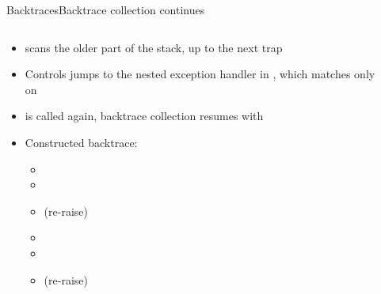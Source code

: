 \begin{frame}{Backtraces}{Backtrace collection continues}
  \begin{columns}[c]
    \begin{column}{0.55\textwidth}
      \minipage[c][0.75\textheight][s]{\columnwidth}
      \begin{itemize}
        \item<1->  scans the older part of the stack, up to the next trap
        \item<6-> Controls jumps to the nested exception handler in , which matches only on 
        \item<7->  is called again, backtrace collection resumes with 
      \end{itemize}
      \medskip
      \begin{itemize}
        \item<2-> Constructed backtrace:
        \begin{itemize}
          \item <2-> 
          \item <2-> 
          \item <3->  (re-raise)
          \item <4-> 
          \item <5-> 
          \item <8->  (re-raise)
        \end{itemize}
      \end{itemize}
      \vfill
      \endminipage
    \end{column}
    \begin{column}{0.45\textwidth}
      \raggedleft
      \onslide*<1>{\providecommand\step{6}}%
    \end{column}
  \end{columns}
\end{frame}


